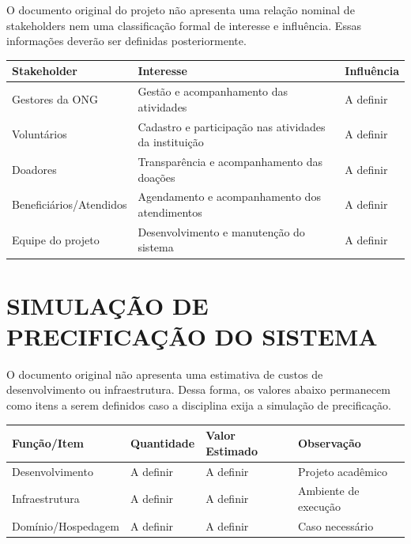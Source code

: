 \documentclass[12pt,a4paper]{article}
\begin{document}
O documento original do projeto não apresenta uma relação nominal de
stakeholders nem uma classificação formal de interesse e influência.
Essas informações deverão ser definidas posteriormente.

\begin{center}
\begin{tabularx}{\textwidth}{P{4cm}Y P{2cm}}
\toprule
\textbf{Stakeholder} & \textbf{Interesse} & \textbf{Influência}\\
\midrule
Gestores da ONG & Gestão e acompanhamento das atividades & A definir\\
Voluntários & Cadastro e participação nas atividades da instituição & A definir\\
Doadores & Transparência e acompanhamento das doações & A definir\\
Beneficiários/Atendidos & Agendamento e acompanhamento dos atendimentos & A definir\\
Equipe do projeto & Desenvolvimento e manutenção do sistema & A definir\\
\bottomrule
\end{tabularx}
\end{center}


\section*{SIMULAÇÃO DE PRECIFICAÇÃO DO SISTEMA}

O documento original não apresenta uma estimativa de custos de
desenvolvimento ou infraestrutura. Dessa forma, os valores abaixo
permanecem como itens a serem definidos caso a disciplina exija a
simulação de precificação.

\begin{center}
\begin{tabularx}{\textwidth}{P{4cm}P{3cm}P{3cm}Y}
\toprule
\textbf{Função/Item} & \textbf{Quantidade} &
\textbf{Valor Estimado} & \textbf{Observação}\\
\midrule
Desenvolvimento & A definir & A definir & Projeto acadêmico\\
Infraestrutura & A definir & A definir & Ambiente de execução\\
Domínio/Hospedagem & A definir & A definir & Caso necessário\\
\bottomrule
\end{tabularx}
\end{center}
\end{document}
